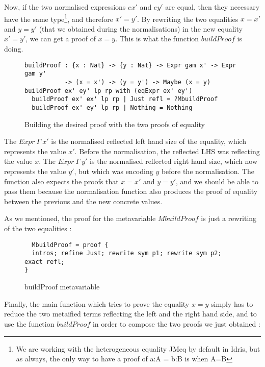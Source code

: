 Now, if the two normalised expressions $ex'$ and $ey'$ are equal, then they necessary have the same type\footnote{We are working with the heterogeneous equality JMeq by default in Idris, but as always, the only way to have a proof of a:A = b:B is when A=B}, and therefore $x'=y'$.
By rewriting the two equalities $x=x'$ and $y=y'$ (that we obtained during the normalisations) in the new equality $x'=y'$, we can get a proof of $x=y$. This is what the function $buildProof$ is doing.

\begin{figure}[H]
\figrule
\begin{center}
\begin{verbatim}
buildProof : {x : Nat} -> {y : Nat} -> Expr gam x' -> Expr gam y' 
           -> (x = x') -> (y = y') -> Maybe (x = y)
buildProof ex' ey' lp rp with (eqExpr ex' ey')
  buildProof ex' ex' lp rp | Just refl = ?MbuildProof
  buildProof ex' ey' lp rp | Nothing = Nothing
\end{verbatim}
\end{center}
\caption{Building the desired proof with the two proofs of equality}
\figrule
\end{figure}


The $Expr\ \Gamma\ x'$ is the normalised reflected left hand size of the equality, which represents the value $x'$. Before the normalisation, the reflected LHS was reflecting the value $x$. The $Expr\ \Gamma\ y'$ is the normalised reflected right hand size, which now represents the value $y'$, but which was encoding $y$ before the normalisation. The function also expects the proofs that $x=x'$ and $y=y'$, and we should be able to pass them because the normalisation function also produces the proof of equality between the previous and the new concrete values.

As we mentioned, the proof for the metavariable $MbuildProof$ is just a rewriting of the two equalities :

\begin{figure}[H]
\figrule
\begin{center}
\begin{verbatim}
  MbuildProof = proof {
  intros; refine Just; rewrite sym p1; rewrite sym p2; exact refl;
}  
\end{verbatim}
\end{center}
\caption{buildProof metavariable}
\figrule
\end{figure}

Finally, the main function which tries to prove the equality $x=y$ simply has to reduce the two metaified terms reflecting the left and the right hand side, and to use the function $buildProof$ in order to compose the two proofs we just obtained :

